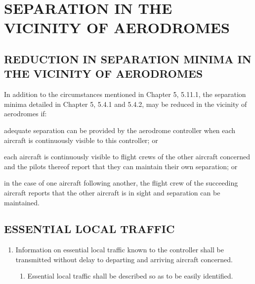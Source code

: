 \documentclass[../vATM.tex]{subfiles}
\begin{document}
    \thispagestyle{1page}
    
    \section[Separation in the Vicinity of Aerodromes]{\texorpdfstring{SEPARATION IN THE VICINITY OF AERODROMES}{}}

    \subsection[Reduction in separation minima in the vicinity of aerodromes]{REDUCTION IN SEPARATION MINIMA IN \\ THE VICINITY OF AERODROMES}

    In addition to the circumstances mentioned in Chapter 5, 5.11.1, the separation minima detailed in Chapter 5, 5.4.1 and 5.4.2, may be reduced in the vicinity of aerodromes if:

    \begin{enumalph}
        \item adequate separation can be provided by the aerodrome controller when each aircraft is continuously visible to this controller; or
        \item each aircraft is continuously visible to flight crews of the other aircraft concerned and the pilots thereof report that they can maintain their own separation; or
        \item in the case of one aircraft following another, the flight crew of the succeeding aircraft reports that the other aircraft is in sight and separation can be maintained.
    \end{enumalph}

    \subsection[Essential local traffic]{ESSENTIAL LOCAL TRAFFIC}

    \begin{enumerate}[label=\arabic{section}.\arabic{subsection}.\arabic*]
        \item Information on essential local traffic known to the controller shall be transmitted without delay to departing and arriving aircraft concerned.

        \begin{enumerate}[label=\arabic{section}.\arabic{subsection}.\arabic{enumi}.\arabic*]
            \item Essential local traffic shall be described so as to be easily identified.
        \end{enumerate}
    \end{enumerate}
\end{document}
